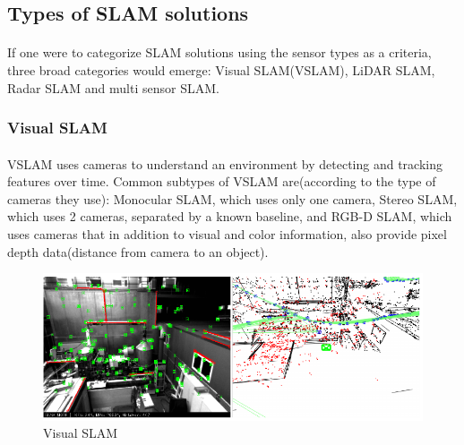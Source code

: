 \subsection{Types of SLAM solutions}
\paragraph{}If one were to categorize SLAM solutions using the sensor types as a criteria, three broad categories would emerge: Visual SLAM(VSLAM), LiDAR SLAM, Radar SLAM and multi sensor SLAM.

\subsubsection{Visual SLAM}
\paragraph{}VSLAM uses cameras to understand an environment by detecting and tracking features over time\cite{chen2018review}. Common subtypes of VSLAM are(according to the type of cameras they use): Monocular SLAM, which uses only one camera, Stereo SLAM, which uses 2 cameras, separated by a known baseline, and RGB-D SLAM, which uses cameras that in addition to visual and color information, also provide pixel depth data(distance from camera to an object).
\begin{figure}[h]
    \centering
    \includegraphics[width=0.75\linewidth]{images/VSLAM.png}
    \caption{Visual SLAM}
    \label{fig:enter-label}
\end{figure}

